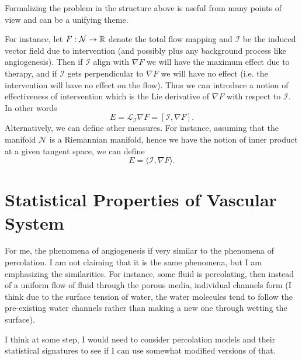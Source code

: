 \begin{observation}
	Formalizing the problem in the structure above is useful from many points of view and can be a unifying theme. 
	
	For instance, let $ F:\mathcal{N}\to \mathbb{R} $ denote the total flow mapping and $ \mathcal{I} $ be the induced vector field due to intervention (and possibly plus any background process like angiogenesis). Then if $ \mathcal{I} $ align with $ \nabla F $ we will have the maximum effect due to therapy, and if $ \mathcal{I} $ gets perpendicular to $ \nabla{F} $ we will have no effect (i.e. the intervention will have no effect on the flow). Thus we can introduce a notion of effectiveness of intervention which is the Lie derivative of $ \nabla F $ with respect to $ \mathcal{I} $. In other words
	\[ E = \mathcal{L}_{\mathcal{I}} \nabla F = [\mathcal{I},\nabla F]. \]
	Alternatively, we can define other measures. For instance, assuming that the manifold $ \mathcal{N} $ is a Riemannian manifold, hence we have the notion of inner product at a given tangent space, we can define
	\[ E = \langle \mathcal{I}, \nabla F \rangle . \]
\end{observation}






\section{Statistical Properties of Vascular System}
For me, the phenomena of angiogenesis if very similar to the phenomena of percolation. I am not claiming that it is the same phenomena, but I am emphasizing the similarities. For instance, some fluid is percolating, then instead of a uniform flow of fluid through the porous media, individual channels form (I think due to the surface tension of water, the water molecules tend to follow the pre-existing water channels rather than making a new one through wetting the surface).

I think at some step, I would need to consider percolation models and their statistical signatures to see if I can use somewhat modified versions of that.
